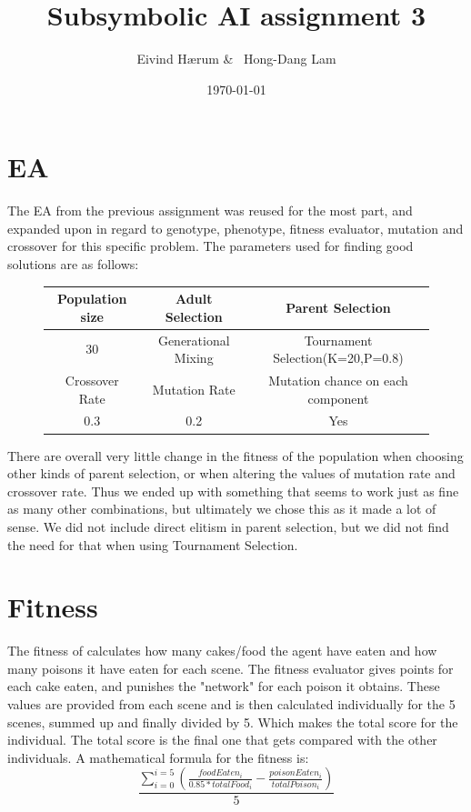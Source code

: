\documentclass[12pt, a4paper]{article}
\title{Subsymbolic AI assignment 3}
\author{Eivind Hærum \& \ Hong-Dang Lam}
\date{\today} %
\begin{document}
\maketitle
% 
% 
\newpage

\tableofcontents
{}
\newpage

\section{EA}

The EA from the previous assignment was reused for the most part, and expanded upon in regard to genotype, phenotype, fitness evaluator, mutation and crossover for this specific problem. 
The parameters used for finding good solutions are as follows:

\begin{figure}[H]
	\begin{center}
	\begin{tabular}{c|c|c}
		Population size & Adult Selection & Parent Selection \\
		\hline
		30 & Generational Mixing  & Tournament Selection(K=20,P=0.8) \\
		\hline
		\hline
		Crossover Rate & Mutation Rate & Mutation chance on each component\\
		\hline
		0.3 & 0.2 & Yes\\
	\end{tabular}
	\end{center}
\end{figure}

There are overall very little change in the fitness of the population when choosing other kinds of parent selection, or when altering the values of mutation rate and crossover rate. Thus we ended up with something that seems to work just as fine as many other combinations, but ultimately we chose this as it made a lot of sense. We did not include direct elitism in parent selection, but we did not find the need for that when using Tournament Selection.


\section{Fitness}
The fitness of calculates how many cakes/food the agent have eaten and how many poisons it have eaten for each scene. The fitness evaluator gives points for each cake eaten, and punishes the "network" for each poison it obtains. These values are provided from each scene and is then calculated individually for the 5 scenes, summed up and finally divided by 5. Which makes the total score for the individual. The total score is the final one that gets compared with the other individuals.
A mathematical formula for the fitness is:
$$ \frac{\sum_{i=0}^{i =5}({\frac{foodEaten_i}{0.85 * totalFood_i} - \frac{poisonEaten_i}{totalPoison_i}})}{5} $$
\end{document}

